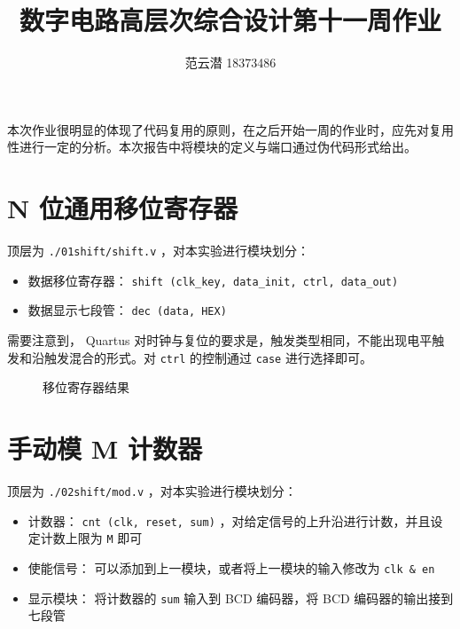 \documentclass[lang=cn,11pt,a4paper,cite=authoryear]{elegantpaper}
\title{数字电路高层次综合设计\quad 第十一周作业}
\author{范云潜 18373486}
\institute{微电子学院 184111 班}
\date{\zhtoday}
\begin{document}
\maketitle


\tableofcontents

\listoffigures

本次作业很明显的体现了代码复用的原则，在之后开始一周的作业时，应先对复用性进行一定的分析。本次报告中将模块的定义与端口通过伪代码形式给出。

\section{N 位通用移位寄存器}

顶层为 \lstinline{./01shift/shift.v} ，对本实验进行模块划分：

\begin{itemize}
    \item 数据移位寄存器： \lstinline{shift (clk_key, data_init, ctrl, data_out)} 
    \item 数据显示七段管： \lstinline{dec (data, HEX)}
\end{itemize}

需要注意到， Quartus 对时钟与复位的要求是，触发类型相同，不能出现电平触发和沿触发混合的形式。对 \lstinline{ctrl} 的控制通过 \lstinline{case} 进行选择即可。



\begin{figure}
    \centering
    \caption{移位寄存器结果}\label{01} 
     \hfill 
     \hfill
     \hfill 
     \bigskip 
\end{figure}

\section{手动模 M 计数器}

顶层为 \lstinline{./02shift/mod.v} ，对本实验进行模块划分：

\begin{itemize}
    \item 计数器： \lstinline{cnt (clk, reset, sum)} ，对给定信号的上升沿进行计数，并且设定计数上限为 \lstinline{M} 即可
    \item 使能信号： 可以添加到上一模块，或者将上一模块的输入修改为 \lstinline{clk & en} 
    \item 显示模块： 将计数器的 \lstinline{sum} 输入到 BCD 编码器，将 BCD 编码器的输出接到七段管
\end{itemize}
\end{document}
